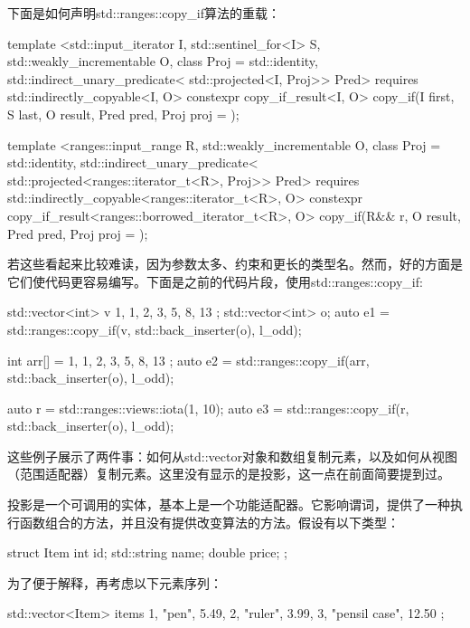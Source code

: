 下面是如何声明std::ranges::copy_if算法的重载：

\begin{cppcode}
template <std::input_iterator I,
		  std::sentinel_for<I> S,
		  std::weakly_incrementable O,
		  class Proj = std::identity,
		  std::indirect_unary_predicate<
		    std::projected<I, Proj>> Pred>
requires std::indirectly_copyable<I, O>
constexpr copy_if_result<I, O> copy_if(I first, S last,
									   O result,
								   	   Pred pred,
									   Proj proj = {} );
									   
template <ranges::input_range R,
		  std::weakly_incrementable O,
		  class Proj = std::identity,
		  std::indirect_unary_predicate<
		  std::projected<ranges::iterator_t<R>, Proj>> Pred>
requires std::indirectly_copyable<ranges::iterator_t<R>, O>
constexpr copy_if_result<ranges::borrowed_iterator_t<R>, O>
		  copy_if(R&& r,
				  O result,
				  Pred pred,
				  Proj proj = {});
\end{cppcode}

若这些看起来比较难读，因为参数太多、约束和更长的类型名。然而，好的方面是它们使代码更容易编写。下面是之前的代码片段，使用std::ranges::copy_if:

\begin{cppcode}
std::vector<int> v{ 1, 1, 2, 3, 5, 8, 13 };
std::vector<int> o;
auto e1 = std::ranges::copy_if(v, std::back_inserter(o),
								l_odd);
								
int arr[] = { 1, 1, 2, 3, 5, 8, 13 };
auto e2 = std::ranges::copy_if(arr, std::back_inserter(o),
								l_odd);

auto r = std::ranges::views::iota(1, 10);
auto e3 = std::ranges::copy_if(r, std::back_inserter(o),
								l_odd);
\end{cppcode}

这些例子展示了两件事：如何从std::vector对象和数组复制元素，以及如何从视图（范围适配器）复制元素。这里没有显示的是投影，这一点在前面简要提到过。

投影是一个可调用的实体，基本上是一个功能适配器。它影响谓词，提供了一种执行函数组合的方法，并且没有提供改变算法的方法。假设有以下类型：

\begin{cppcode}
struct Item
{
	int id;
	std::string name;
	double price;
};
\end{cppcode}

为了便于解释，再考虑以下元素序列：

\begin{cppcode}
std::vector<Item> items{
	{1, "pen", 5.49},
	{2, "ruler", 3.99},
	{3, "pensil case", 12.50}
};
\end{cppcode}

